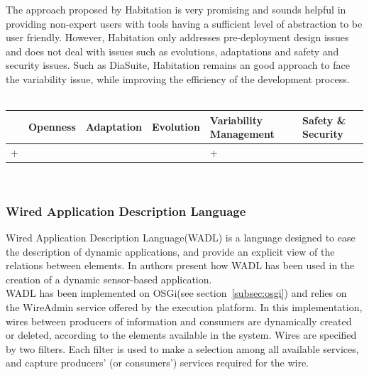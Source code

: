 The approach proposed by Habitation is very promising and sounds helpful in providing non-expert users with tools having a sufficient level of abstraction to be user friendly. However, Habitation only addresses pre-deployment design issues and does not deal with issues such as evolutions, adaptations and safety and security issues. Such as DiaSuite, Habitation remains an good approach to face the variability issue, while improving the efficiency of the development process.\\
\\
\begin{tabular}{ >{\centering}m{}| >{\centering}m{} >{\centering}m{}| >{\centering}m{} >{\centering}m{}| >{\centering\arraybackslash}m{}}
{\tiny Interoperability} & {\tiny Openness} & {\tiny Adaptation} & {\tiny Evolution} & {\tiny Variability Management} & {\tiny Safety \& Security}\\
 \hline
 + &  &  &  & + & \\ 
  \hline
\end{tabular}\\


\subsubsection{Wired Application Description Language}
Wired Application Description Language(WADL) is a language designed to ease the description of dynamic applications, and provide an explicit view of the relations between elements. In \cite{Cervantes:2008} authors present how WADL has been used in the creation of a dynamic sensor-based application.\\
WADL has been implemented on OSGi(see section~\ref{subsec:osgi}) and relies on the WireAdmin service offered by the execution platform. In this implementation, wires between producers of information and consumers are dynamically created or deleted, according to the elements available in the system. Wires are specified by two filters. Each filter is used to make a selection among all available services, and capture producers' (or consumers') services required for the wire.\\

